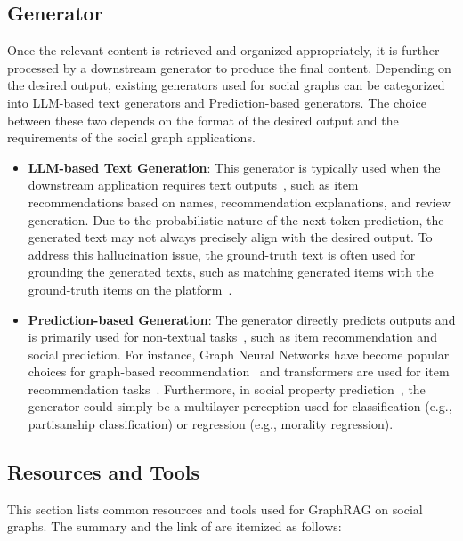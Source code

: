 \subsection{Generator}
Once the relevant content is retrieved and organized appropriately, it is further processed by a downstream generator to produce the final content. Depending on the desired output, existing generators used for social graphs can be categorized into LLM-based text generators and Prediction-based generators. The choice between these two depends on the format of the desired output and the requirements of the social graph applications.

\begin{itemize}[leftmargin=*]
    \item \textbf{LLM-based Text Generation}: This generator is typically used when the downstream application requires text outputs~\cite{zeng2024federated, xie2023factual, wang2023zero, wang2024augmenting}, such as item recommendations based on names, recommendation explanations, and review generation. Due to the probabilistic nature of the next token prediction, the generated text may not always precisely align with the desired output. To address this hallucination issue, the ground-truth text is often used for grounding the generated texts, such as matching generated items with the ground-truth items on the platform~\cite{hou2024large}.

    \item \textbf{Prediction-based Generation}: The generator directly predicts outputs and is primarily used for non-textual tasks~\cite{du2024large}, such as item recommendation and social prediction. For instance, Graph Neural Networks have become popular choices for graph-based recommendation~\cite{du2024large, wei2024llmrec} and transformers are used for item recommendation tasks~\cite{wang2024knowledge2}. Furthermore, in social property prediction~\cite{jiang2023social}, the generator could simply be a multilayer perception used for classification (e.g., partisanship classification) or regression (e.g., morality regression).
    
\end{itemize}


\subsection{Resources and Tools}

This section lists common resources and tools used for GraphRAG on social graphs. The summary and the link of  are itemized as follows:

